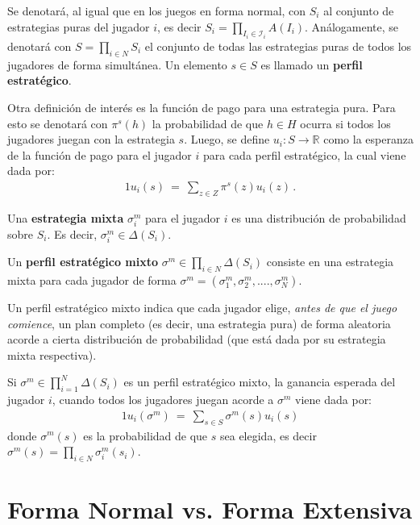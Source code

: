 Se denotará, al igual que en los juegos en forma normal, con $S_i$ al conjunto de estrategias puras del jugador $i$, es decir $S_i=\prod_{I_i \in \mathcal{I}_i} A(I_i)$. Análogamente, se denotará con $S = \prod_{i \in N} S_i$ el conjunto de todas las estrategias puras de todos los jugadores de forma simultánea. Un elemento $s \in S$ es llamado un \textbf{perfil estratégico}.

Otra definición de interés es la función de pago para una estrategia pura. Para esto se denotará con $\pi^s(h)$ la probabilidad de que $h \in H $ ocurra si todos los jugadores juegan con la estrategia $s$. Luego, se define $u_i : S \rightarrow \mathbb{R}$ como la esperanza de la función de pago para el jugador $i$ para cada perfil estratégico, la cual viene dada por:
\begin{alignat}{1}
\label{eq:funcion-pago-fe}
u_i(s)\ =\ \sum_{z \in Z} \pi^s(z) u_i(z) \,.
\end{alignat} 

\begin{definition}
\label{def:estrategia-mixta-fe}
Una \textbf{estrategia mixta} $\sigma^m_i$ para el jugador $i$ es una distribución de probabilidad sobre $S_i$. Es decir, $\sigma_i^m \in \Delta(S_i)$.
\end{definition}

\begin{definition}
Un \textbf{perfil estratégico mixto} $\sigma^m \in \prod_{i \in N} \Delta(S_i)$ consiste en una estrategia mixta para cada jugador de forma $\sigma^m = (\sigma_1^m, \sigma_2^m, ...., \sigma_N^m)$.
\end{definition}

Un perfil estratégico mixto indica que cada jugador elige, \emph{antes de que el juego comience}, un plan completo (es decir, una estrategia pura) de forma aleatoria acorde a cierta distribución de probabilidad (que está dada por su estrategia mixta respectiva).

Si $\sigma^m \in \prod_{i = 1}^N \Delta(S_i)$ es un perfil estratégico mixto, la ganancia esperada del jugador $i$, cuando todos los jugadores juegan acorde a $\sigma^m$ viene dada por:
\begin{alignat}{1}
u_i(\sigma^m)\ =\ \sum_{s \in S} \sigma^m(s)u_i(s)
\end{alignat}
donde $\sigma^m(s)$ es la probabilidad de que $s$ sea elegida, es decir $\sigma^m(s) = \prod_{i \in N} \sigma_i^m(s_i)$.

\section{Forma Normal vs. Forma Extensiva}
\label{section:normal-extensiva}


